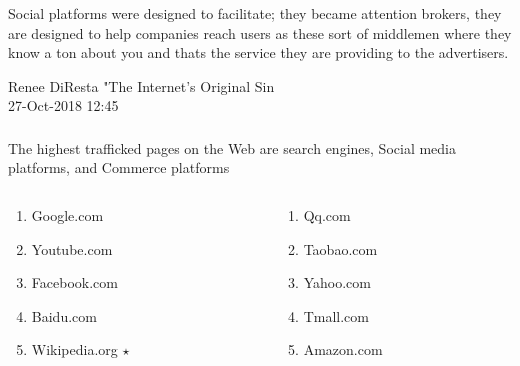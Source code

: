 \documentclass[aspectratio=169]{beamer}
\newcounter{savedenum}
\newcommand*{\saveenum}{\setcounter{savedenum}{\theenumi}}
\newcommand*{\resume}{\setcounter{enumi}{\thesavedenum}}
\begin{document}
\begin{frame}
\frametitle{}
\epigraph{Social platforms were designed to facilitate; they became attention brokers, they are designed to help companies reach users as these sort of middlemen where they know a ton about you and thats the service they are providing to the advertisers.}{Renee DiResta "The Internet's Original Sin\\ 27-Oct-2018 12:45}

\end{frame}

\begin{frame}
\frametitle{}
The highest trafficked pages on the Web are search engines, Social media platforms, and Commerce platforms
\begin{columns}[T]
  \begin{column}{.5\linewidth}
  \begin{enumerate}
	\item{Google.com}
	\item{Youtube.com}
	\item{Facebook.com}
	\item{Baidu.com}
	\item{Wikipedia.org $\star$}
    \saveenum
  \end{enumerate}
  \end{column}
  \begin{column}{.5\linewidth}
  \begin{enumerate}
    \resume
         \item{Qq.com}
	\item{Taobao.com}
	\item{Yahoo.com}
	\item{Tmall.com}
	\item{Amazon.com}  
	\end{enumerate}
  \end{column}
\end{columns}

\end{frame}
\end{document}
